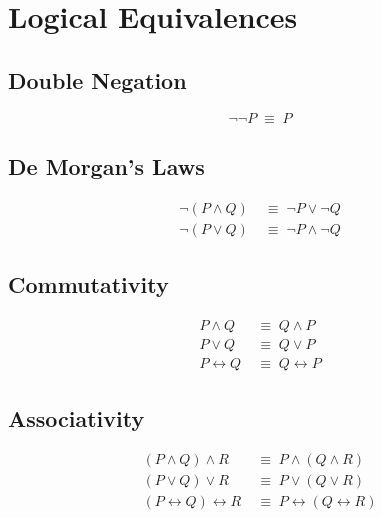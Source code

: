 
\section{Logical Equivalences}

\subsection{Double Negation}

\begin{theorem}
\[
\neg\neg P \;\equiv\; P
\]
\end{theorem}

\subsection{De Morgan's Laws}

\begin{theorem}
\begin{align*}
\neg(P \wedge Q) &\;\equiv\; \neg P \vee \neg Q \\
\neg(P \vee Q) &\;\equiv\; \neg P \wedge \neg Q
\end{align*}
\end{theorem}

\subsection{Commutativity}

\begin{theorem}[Commutativity]
\begin{align*}
P \wedge Q &\;\equiv\; Q \wedge P \\
P \vee Q &\;\equiv\; Q \vee P \\
P \leftrightarrow Q &\;\equiv\; Q \leftrightarrow P
\end{align*}
\end{theorem}

\subsection{Associativity}

\begin{theorem}[Associativity]
\begin{align*}
(P \wedge Q) \wedge R &\;\equiv\; P \wedge (Q \wedge R) \\
(P \vee Q) \vee R &\;\equiv\; P \vee (Q \vee R) \\
(P \leftrightarrow Q) \leftrightarrow R &\;\equiv\; P \leftrightarrow (Q \leftrightarrow R)
\end{align*}
\end{theorem}

